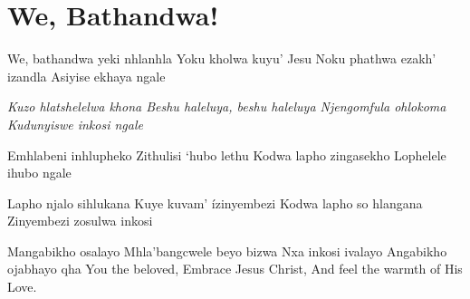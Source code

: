 \starttocol
\chapter{We, Bathandwa!}
\nexttocol
\hfill{\it }
\stoptocol
\starttocol
\startlines
{\sc We}, bathandwa yeki nhlanhla
Yoku kholwa kuyu' Jesu
Noku phathwa ezakh' izandla
Asiyise ekhaya ngale

{\it Kuzo hlatshelelwa khona
Beshu haleluya, beshu haleluya
Njengomfula ohlokoma
Kudunyiswe inkosi ngale}

Emhlabeni inhlupheko
Zithulisi `hubo lethu
Kodwa lapho zingasekho
Lophelele ihubo ngale

Lapho njalo sihlukana
Kuye kuvam' \'izinyembezi
Kodwa lapho so hlangana
Zinyembezi zosulwa inkosi

Mangabikho osalayo
Mhla'bangcwele beyo  bizwa
Nxa inkosi ivalayo
Angabikho ojabhayo qha
\stoplines
\nexttocol
You the beloved,
Embrace Jesus Christ,
And feel the warmth
of His Love.
\stoptocol

